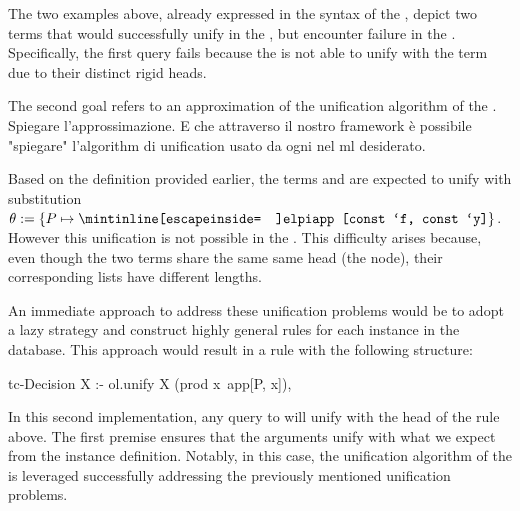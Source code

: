 \documentclass{rapport}
\begin{document}
%

\noindent The two examples above, already expressed in the syntax of the \ml,
depict two terms that would successfully unify in the \ol, but encounter failure
in the \ml. Specifically, the first query fails because the \ml is not able to unify  with the term  due to their distinct rigid heads. 

The second goal refers to an approximation of the unification algorithm of the \ol. Spiegare l'approssimazione. E che
attraverso il nostro framework è possibile "spiegare" l'algorithm di unification
usato da ogni \ol nel ml desiderato. 

Based on the definition provided earlier, the terms  and  are expected to unify with substitution $\theta := \{P
\mapsto \texttt{\elpiIn{app [const `f, const `y]}} \}$. However this unification
is not possible in the \ml. This difficulty arises because, even though 
the two terms share the same same head
(the  node), their corresponding lists have different lengths.

An immediate approach to address these unification problems
would be to adopt a lazy strategy and construct highly general rules for each instance in the database.
This approach would result in a rule with the following structure:

\begin{center}
  \begin{minipage}[c]{0.46\linewidth}
    \begin{elpicode}
      tc-Decision X :- 
        ol.unify X (prod x\ app[P, x]),
    \end{elpicode}
  \end{minipage}
\end{center}

\noindent In this second implementation, any query to 
will unify with the head of the rule above. The first
premise ensures that the arguments unify with what we expect from the
instance definition. Notably, in this case, the unification algorithm of
the \ol is leveraged successfully addressing the previously mentioned unification problems.
\end{document}
